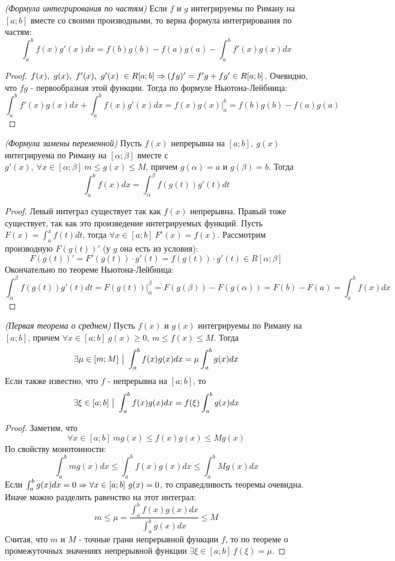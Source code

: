 \begin{corollary} \textit{(Формула интегрирования по частям)}
	Если $f$ и $g$ интегрируемы по Риману на $[a;b]$ вместе со своими производными, то верна формула интегрирования по частям:
	\[
		\int_a^bf(x)g'(x)dx = f(b)g(b) - f(a)g(a) - \int_a^bf'(x)g(x)dx
	\]
\end{corollary}

\begin{proof}
	$\\ f(x),\ g(x),\ f'(x),\ g'(x)\ \in R[a;b] \Ra (fg)'= f'g + fg' \in R[a;b]$.
	Очевидно, что $fg$ - первообразная этой функции. Тогда по формуле Ньютона-Лейбница:
	\[
		\int_a^bf'(x)g(x)dx + \int_a^bf(x)g'(x)dx = f(x)g(x)\Bigg |^b_a = f(b)g(b) - f(a)g(a)
	\]
\end{proof}

\begin{theorem} \textit{(Формула замены переменной)}
	Пусть $f(x)$ непрерывна на $[a;b],\ g(x)$ интегрируема по Риману на $[\alpha; \beta]$ вместе с $g'(x),\ \forall x \in [\alpha; \beta]\ m \leq g(x) \leq M$, причем $g(\alpha) = a\text{ и } g(\beta) = b$. Тогда 
	\[
		\int_a^bf(x)dx = \int_\alpha^\beta f(g(t))g'(t)dt
	\]
\end{theorem}

\begin{proof}
	Левый интеграл существует так как $f(x)$ непрерывна. Правый тоже существует, так как это произведение интегрируемых функций.
	Пусть $F(x) = \int_a^xf(t)dt$, тогда $\forall x \in [a;b]\ F'(x) = f(x)$.
	Рассмотрим производную $F(g(t))'$ (у $g$ она есть из условия):
	\[
		F(g(t))' = F'(g(t))\cdot g'(t) = f(g(t))\cdot g'(t) \in R[\alpha;\beta]
	\]
	Окончательно по теореме Ньютона-Лейбница:
	\[
		\int_\alpha^\beta f(g(t))g'(t)dt = F(g(t)) \Biggr |_\alpha^\beta = F(g(\beta)) - F(g(\alpha))= F(b) - F(a) = \int_a^bf(x)dx
	\]
\end{proof}

\begin{theorem} \textit{(Первая теорема о среднем)}
	Пусть $f(x)$ и $g(x)$ интегрируемы по Риману на $[a;b]$, причем $\forall x \in [a;b]\ g(x) \geq 0$, $m \leq f(x) \leq M$. Тогда 
	\[
		\exists \mu \in [m;M] \ \big|\  \int_a^bf(x)g(x)dx = \mu \int_a^bg(x)dx
	\]
	Если также известно, что $f$ - непрерывна на $[a;b]$, то 
	\[
		\exists \xi \in [a;b]\ \big|\  \int_a^bf(x)g(x)dx = f(\xi)\int_a^bg(x)dx
	\]
\end{theorem}

\begin{proof}
	Заметим, что
	\[
		\forall x\in [a;b]\ mg(x) \leq f(x)g(x) \leq Mg(x)
	\]
	По свойству монотонности:
	\[
		\int_a^b mg(x)dx \leq \int_a^b f(x)g(x)dx \leq \int_a^b Mg(x)dx
	\]
	Если $\int_a^bg(x)dx = 0 \Rightarrow \forall x \in [a;b]\ g(x) = 0$, то справедливость теоремы очевидна.
	Иначе можно разделить равенство на этот интеграл:
	\[
		m \leq \mu = \frac{\int_a^b f(x)g(x)dx}{\int_a^b g(x)dx} \leq M
	\]
	Считая, что $m$ и $M$ - точные грани непрерывной функции $f$, то по теореме о промежуточных значениях непрерывной функции $\exists \xi \in [a;b]\ f(\xi) = \mu$.
\end{proof}


